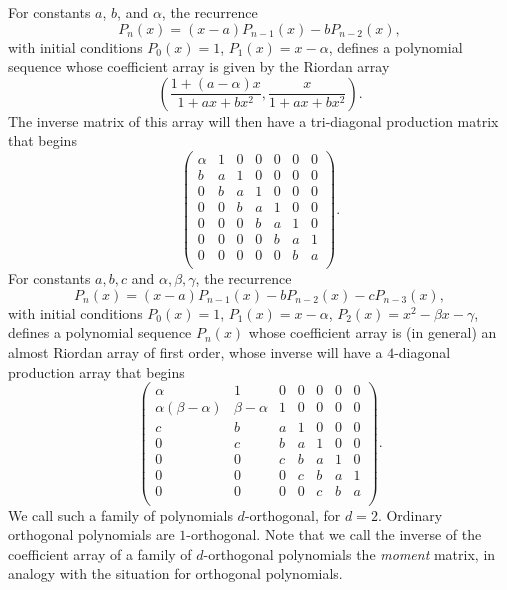 \documentclass[12pt,reqno]{article}
\theoremstyle{definition}
\begin{document}
For constants $a$,  $b$, and $\alpha$, the recurrence
$$P_n(x)=(x-a)P_{n-1}(x)-b P_{n-2}(x),$$ with initial conditions $P_0(x)=1$, $P_1(x)=x-\alpha$, defines a polynomial sequence whose coefficient array is given by the Riordan array
$$\left(\frac{1+(a-\alpha)x}{1+ax+bx^2}, \frac{x}{1+ax+bx^2}\right).$$
The inverse matrix of this array will then have a tri-diagonal production matrix that begins
$$\left(
\begin{array}{ccccccc}
\alpha &1 & 0 & 0 & 0 & 0 & 0 \\
b &a & 1 & 0 & 0 & 0 & 0 \\
0 &b & a & 1 & 0 & 0 & 0 \\
0 & 0 & b & a & 1 & 0 & 0 \\
0 & 0 & 0 & b & a & 1 & 0 \\
0 & 0 & 0 & 0 & b & a & 1 \\
0 & 0 & 0 & 0 & 0 & b & a \\
\end{array}\right).$$
For constants $a, b, c$ and $\alpha, \beta, \gamma$, the recurrence
$$P_n(x)=(x-a)P_{n-1}(x)-b P_{n-2}(x)-c P_{n-3}(x),$$ with initial conditions $P_0(x)=1$, $P_1(x)=x-\alpha$, $P_2(x)=x^2-\beta x - \gamma$, defines a polynomial sequence $P_n(x)$ whose coefficient array is (in general) an almost Riordan array of first order, whose inverse will have a $4$-diagonal production array that begins
$$\left(
\begin{array}{ccccccc}
\alpha &1 & 0 & 0 & 0 & 0 & 0 \\
\alpha(\beta-\alpha) & \beta-\alpha & 1 & 0 & 0 & 0 & 0 \\
c & b & a & 1 & 0 & 0 & 0 \\
0 & c & b & a & 1 & 0 & 0 \\
0 & 0 & c & b & a & 1 & 0 \\
0 & 0 & 0 & c & b & a & 1 \\
0 & 0 & 0 & 0 & c & b & a \\
\end{array}\right).$$
We call such a family of polynomials $d$-orthogonal, for $d=2$. Ordinary orthogonal polynomials are $1$-orthogonal. Note that we call the inverse of the coefficient array of a family of $d$-orthogonal polynomials the \emph{moment} matrix, in analogy with the situation for orthogonal polynomials.
\end{document}
